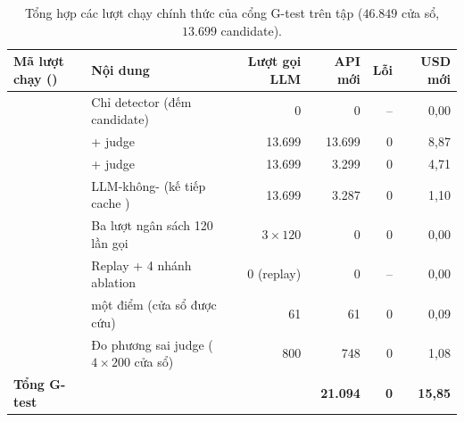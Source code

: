 \begin{table}[H]
  \centering
  \caption[Danh sách các lượt chạy kiểm định trên tập test]{Tổng hợp các lượt chạy chính thức của cổng G-test trên tập  ($46.849$ cửa sổ, $13.699$ candidate).}
  \label{tab:ch5-test-runs}
  \tblfont
  \tblsetup
  \setlength{\tabcolsep}{3.5pt}
  \begin{tabularx}{\linewidth}{|>{\raggedright\arraybackslash}p{5.0cm}|Y|r|r|r|r|}
    \hline
    \textbf{Mã lượt chạy ()} & \textbf{Nội dung} & \textbf{Lượt gọi LLM} & \textbf{API mới} & \textbf{Lỗi} & \textbf{USD mới} \\
    \hline
     & Chỉ detector (đếm candidate) & 0 & 0 & -- & 0,00 \\
    \hline
     &  + judge & 13.699 & 13.699 & 0 & 8,87 \\
    \hline
     &  + judge & 13.699 & 3.299 & 0 & 4,71 \\
    \hline
     & LLM-không- (kế tiếp cache ) & 13.699 & 3.287 & 0 & 1,10 \\
    \hline
     & Ba lượt ngân sách 120 lần gọi & $3 \times 120$ & 0 & 0 & 0,00 \\
    \hline
     & Replay \CTAV{} + 4 nhánh ablation & 0 (replay) & 0 & -- & 0,00 \\
    \hline
     &  một điểm (cửa sổ được cứu) & 61 & 61 & 0 & 0,09 \\
    \hline
     & Đo phương sai judge ($4 \times 200$ cửa sổ) & 800 & 748 & 0 & 1,08 \\
    \hline
    \textbf{Tổng G-test} & & & \textbf{21.094} & \textbf{0} & \textbf{15,85} \\
    \hline
  \end{tabularx}
\end{table}


